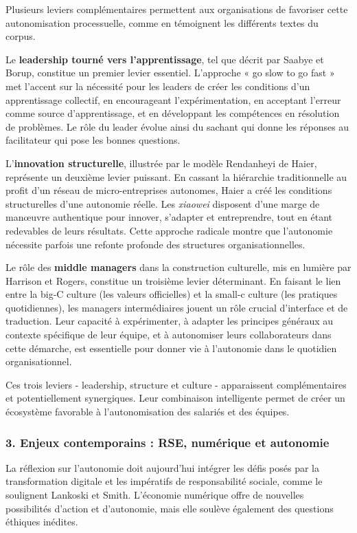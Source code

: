 \documentclass{rapportECL}
\begin{document}
Plusieurs leviers complémentaires permettent aux organisations de favoriser cette autonomisation processuelle, comme en témoignent les différents textes du corpus.

Le \textbf{leadership tourné vers l'apprentissage}, tel que décrit par Saabye et Borup, constitue un premier levier essentiel. L'approche « go slow to go fast » met l'accent sur la nécessité pour les leaders de créer les conditions d'un apprentissage collectif, en encourageant l'expérimentation, en acceptant l'erreur comme source d'apprentissage, et en développant les compétences en résolution de problèmes. Le rôle du leader évolue ainsi du sachant qui donne les réponses au facilitateur qui pose les bonnes questions.

L'\textbf{innovation structurelle}, illustrée par le modèle Rendanheyi de Haier, représente un deuxième levier puissant. En cassant la hiérarchie traditionnelle au profit d'un réseau de micro-entreprises autonomes, Haier a créé les conditions structurelles d'une autonomie réelle. Les \textit{xiaowei} disposent d'une marge de manœuvre authentique pour innover, s'adapter et entreprendre, tout en étant redevables de leurs résultats. Cette approche radicale montre que l'autonomie nécessite parfois une refonte profonde des structures organisationnelles.

Le rôle des \textbf{middle managers} dans la construction culturelle, mis en lumière par Harrison et Rogers, constitue un troisième levier déterminant. En faisant le lien entre la big-C culture (les valeurs officielles) et la small-c culture (les pratiques quotidiennes), les managers intermédiaires jouent un rôle crucial d'interface et de traduction. Leur capacité à expérimenter, à adapter les principes généraux au contexte spécifique de leur équipe, et à autonomiser leurs collaborateurs dans cette démarche, est essentielle pour donner vie à l'autonomie dans le quotidien organisationnel.

Ces trois leviers - leadership, structure et culture - apparaissent complémentaires et potentiellement synergiques. Leur combinaison intelligente permet de créer un écosystème favorable à l'autonomisation des salariés et des équipes.

\subsubsection*{3. Enjeux contemporains : RSE, numérique et autonomie}

La réflexion sur l'autonomie doit aujourd'hui intégrer les défis posés par la transformation digitale et les impératifs de responsabilité sociale, comme le soulignent Lankoski et Smith. L'économie numérique offre de nouvelles possibilités d'action et d'autonomie, mais elle soulève également des questions éthiques inédites.
\end{document}
